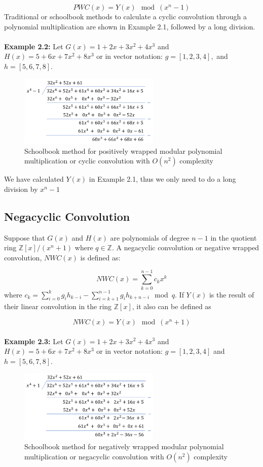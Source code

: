 \documentclass[12pt]{report}
\begin{document}
\[PWC(x) = Y(x) \mod (x^n - 1)\]
Traditional or schoolbook methods to calculate a cyclic convolution through a polynomial multiplication are shown in Example 2.1, followed by a long division. \\ \\
\textbf{Example 2.2:} Let $G(x)=1+2x+3x^{2}+4x^{3}$ and $H(x)=5+6x+7x^{2}+8x^{3}$ or in vector notation: $g=[1,2,3,4],$ and $h=[5,6,7,8]$.
\begin{figure}[h]
\centering
\includegraphics[width=0.6\textwidth]{./ntt_figures/2.png}
\caption{Schoolbook method for positively wrapped modular polynomial multiplication or cyclic convolution with $O(n^2)$ complexity}
\label{fig:cyclic_convolution}
\end{figure}

\noindent We have calculated $Y(x)$ in Example 2.1, thus we only need to do a long division by $x^{n}-1$

\subsection{Negacyclic Convolution}

Suppose that $G(x)$ and $H(x)$ are polynomials of degree $n-1$ in the quotient ring $\mathbb{Z}[x]/(x^{n}+1)$ where $q \in \mathbb{Z}$. A negacyclic convolution or negative wrapped convolution, $NWC(x)$ is defined as:

\[NWC(x) = \sum_{k=0}^{n-1} c_k x^k\]
where $c_{k}=\sum_{i=0}^{k}g_{i}h_{k-i}-\sum_{i=k+1}^{n-1}g_{i}h_{k+n-i} \mod q$. If $Y(x)$ is the result of their linear convolution in the ring $\mathbb{Z}[x]$, it also can be defined as

\[NWC(x) = Y(x) \mod (x^{n}+1)\] \\
\textbf{Example 2.3:} Let $G(x)=1+2x+3x^{2}+4x^{3}$ and $H(x)=5+6x+7x^{2}+8x^{3}$ or in vector notation: $g=[1,2,3,4]$ and $h=[5,6,7,8].$

\begin{figure}[H]
\centering
\includegraphics[width=0.6\textwidth]{./ntt_figures/3.png}
\caption{Schoolbook method for negatively wrapped modular polynomial multiplication or negacyclic convolution with $O(n^2)$ complexity}
\label{fig:negacyclic_convolution}
\end{figure}
\end{document}
